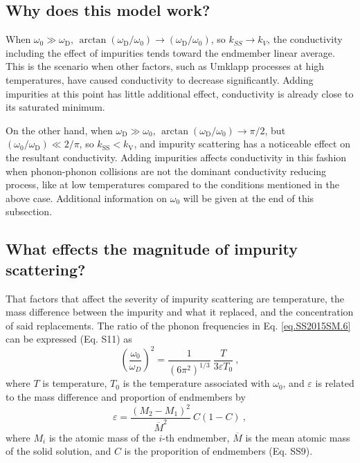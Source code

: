 \subsection{Why does this model work?} 

When $\omega_{\mathrm{0}} \gg \omega_{\mathrm{D}}$, $\arctan(\omega_{\mathrm{D}}/\omega_{\mathrm{0}}) \rightarrow (\omega_{\mathrm{D}}/\omega_{\mathrm{0}})$, so $k_{SS} \rightarrow k_{V}$, the conductivity including the effect of impurities tends toward the endmember linear average. This is the scenario when other factors, such as Umklapp processes at high temperatures, have caused conductivity to decrease significantly. Adding impurities at this point has little additional effect, conductivity is already close to its saturated minimum.

On the other hand, when $\omega_{\mathrm{D}}\gg\omega_{\mathrm{0}}$, $\arctan(\omega_{\mathrm{D}}/\omega_{\mathrm{0}})\rightarrow\pi/2$, but $(\omega_{\mathrm{0}}/\omega_{\mathrm{D}})\ll 2/\pi$, so $k_{\mathrm{SS}} < k_{\mathrm{V}}$, and impurity scattering has a noticeable effect on the resultant conductivity. Adding impurities affects conductivity in this fashion when phonon-phonon collisions are not the dominant conductivity reducing process, like at low temperatures compared to the conditions mentioned in the above case. Additional information on $\omega_{\mathrm{0}}$ will be given at the end of this subsection.

\subsection{What effects the magnitude of impurity scattering?} 

That factors that affect the severity of impurity scattering are temperature, the mass difference between the impurity and what it replaced, and the concentration of said replacements. The ratio of the phonon frequencies in Eq. \ref{eq.SS2015SM.6} can be expressed (Eq. S11) as
%
\begin{equation}
\left ( \frac{\omega_{0}}{\omega_{D}} \right )^{2} = \frac{1}{\left ( 6\pi^{2} \right )^{1/3}} \ \frac{T}{3 \varepsilon T_{0}} \ ,
\label{eq.SS2015SM.11}
\end{equation}
%
where $T$ is temperature, $T_{\mathrm{0}}$ is the temperature associated with $\omega_{0}$, and $\varepsilon$ is related to the mass difference and proportion of endmembers by
%
\begin{equation}
\varepsilon = \frac{\left (M_{2}-M_{1}  \right )^{2}}{\overline{M}^{2}} \ C\left ( 1-C \right ) \ ,
\label{eq.SS2015SM.9}
\end{equation}
%
where $M_{i}$ is the atomic mass of the $i$-th endmember, $\overline{M}$ is the mean atomic mass of the solid solution, and $C$ is the proporition of endmembers (Eq. SS9).


